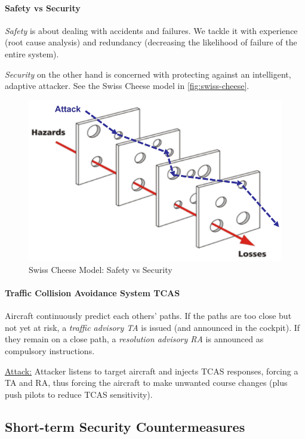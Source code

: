 \paragraph{Safety vs Security}
\textit{Safety} is about dealing with accidents and failures.
We tackle it with experience (root cause analysis) and redundancy (decreasing the likelihood of failure of the entire system).

\textit{Security} on the other hand is concerned with protecting against an intelligent, adaptive attacker.
See the Swiss Cheese model in \autoref{fig:swiss-cheese}.

\begin{figure}[h]
	\centering
	\includegraphics[scale=0.5]{images/6-swiss-cheese.png}
	\caption{Swiss Cheese Model: Safety vs Security}
	\label{fig:swiss-cheese}
\end{figure}

\paragraph{Traffic Collision Avoidance System TCAS}
Aircraft continuously predict each others' paths.
If the paths are too close but not yet at risk, a \textit{traffic advisory TA} is issued (and announced in the cockpit).
If they remain on a close path, a \textit{resolution advisory RA} is announced as compulsory instructions.

\underline{Attack:}
Attacker listens to target aircraft and injects TCAS responses, forcing a TA and RA, thus forcing the aircraft to make unwanted course changes (plus push pilots to reduce TCAS sensitivity).



\subsection{Short-term Security Countermeasures}

